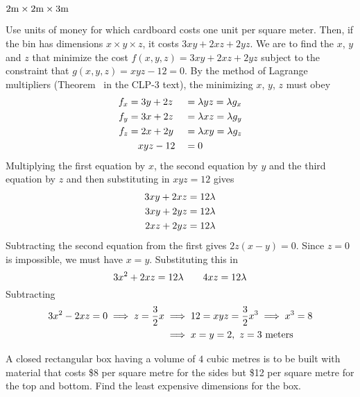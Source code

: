 %

\begin{answer}
$2{\rm m}\times 2{\rm m}\times 3{\rm m}$
\end{answer}

\begin{solution}
Use units of money for which cardboard costs one unit per
square meter. Then, if the bin has dimensions $x\times y\times z$, it costs
$3xy+2xz+2yz$. We are to find the $x$, $y$ and $z$ that minimize the cost $f(x,y,z)=3xy+2xz+2yz$ subject to the constraint that $g(x,y,z)=xyz-12=0$. 
By the method of Lagrange multipliers (Theorem~ 
in the CLP-3 text), the minimizing $x$, $y$, $z$ must obey
\begin{alignat*}{3}
f_x&=3y+2z&&=\lambda yz=\lambda g_x \\
f_y&=3x+2z&&=\lambda xz=\lambda g_y \\
f_z&=2x+2y&&=\lambda xy=\lambda g_z \\
&\ \ \ xyz-12&&=0
\end{alignat*}
Multiplying the first equation by $x$, the second equation by $y$ 
and the third equation by $z$ and then substituting in $xyz=12$ gives
\begin{align*}
3xy+2xz&=12\lambda \\
3xy+2yz&=12\lambda \\
2xz+2yz&=12\lambda 
\end{align*}
Subtracting the second equation from the first gives $2z(x-y)=0$.
Since $z=0$ is impossible, we must have $x=y$. Substituting this in
\begin{equation*}
3x^2+2xz=12\lambda\qquad 4xz=12\lambda
\end{equation*}
Subtracting
\begin{align*}
3x^2-2xz=0\implies z=\frac{3}{2}x
&\implies 12=xyz=\frac{3}{2}x^3
\implies x^3=8 \\
&\implies x=y=2,\ z=3\ {\rm meters}
\end{align*}
\end{solution}

\begin{question}[M200 2000D] %
A closed rectangular box having a volume of $4$ cubic metres
is to be built with material that costs \$8 per square metre for the sides
but \$12 per square metre for the top and bottom. Find the least expensive
dimensions for the box.
\end{question}

